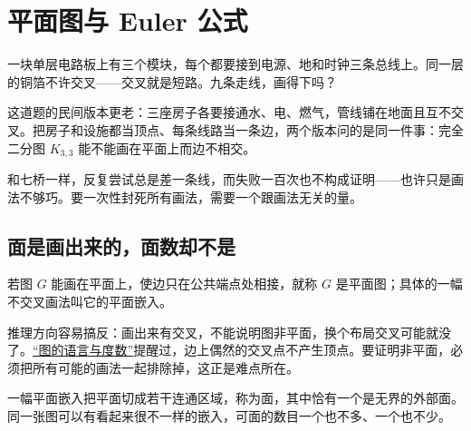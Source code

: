 \section{平面图与 Euler 公式}
\label{sec:04-Discrete-Mathematics/03-Graph-Theory/09}

一块单层电路板上有三个模块，每个都要接到电源、地和时钟三条总线上。同一层的铜箔不许交叉——交叉就是短路。九条走线，画得下吗？

这道题的民间版本更老：三座房子各要接通水、电、燃气，管线铺在地面且互不交叉。把房子和设施都当顶点、每条线路当一条边，两个版本问的是同一件事：完全二分图 \(K_{3,3}\) 能不能画在平面上而边不相交。

和七桥一样，反复尝试总是差一条线，而失败一百次也不构成证明——也许只是画法不够巧。要一次性封死所有画法，需要一个跟画法无关的量。

\subsection{面是画出来的，面数却不是}

若图 \(G\) 能画在平面上，使边只在公共端点处相接，就称 \(G\) 是平面图；具体的一幅不交叉画法叫它的平面嵌入。

推理方向容易搞反：画出来有交叉，不能说明图非平面，换个布局交叉可能就没了。\hyperref[sec:04-Discrete-Mathematics/03-Graph-Theory/01]{``图的语言与度数''}提醒过，边上偶然的交叉点不产生顶点。要证明非平面，必须把所有可能的画法一起排除掉，这正是难点所在。

一幅平面嵌入把平面切成若干连通区域，称为面，其中恰有一个是无界的外部面。同一张图可以有看起来很不一样的嵌入，可面的数目一个也不多、一个也不少。

